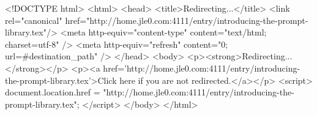 <!DOCTYPE html>
<html>
<head>
<title>Redirecting...</title>
<link rel="canonical" href="http://home.jle0.com:4111/entry/introducing-the-prompt-library.tex"/>
<meta http-equiv="content-type" content="text/html; charset=utf-8" />
<meta http-equiv="refresh" content="0; url=#{destination_path}" />
</head>
<body>
  <p><strong>Redirecting...</strong></p>
  <p><a href='http://home.jle0.com:4111/entry/introducing-the-prompt-library.tex'>Click here if you are not redirected.</a></p>
  <script>
    document.location.href = "http://home.jle0.com:4111/entry/introducing-the-prompt-library.tex";
  </script>
</body>
</html>

